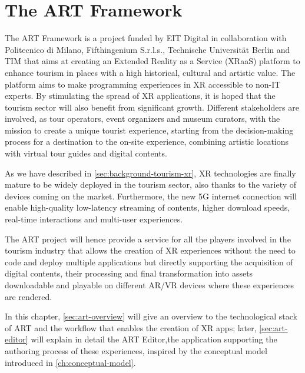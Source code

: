 \chapter{The ART Framework}
\label{ch:art}

The ART Framework is a project funded by EIT Digital in collaboration with Politecnico di Milano, Fifthingenium S.r.l.s., Technische Universität Berlin and TIM that aims at creating an Extended Reality as a Service (XRaaS) platform to enhance tourism in places with a high historical, cultural and artistic value. The platform aims to make programming experiences in XR accessible to non-IT experts. By stimulating the spread of XR applications, it is hoped that the tourism sector will also benefit from significant growth. Different stakeholders are involved, as tour operators, event organizers and museum curators, with the mission to create a unique tourist experience, starting from the decision-making process for a destination to the on-site experience, combining artistic locations with virtual tour guides and digital contents.

As we have described in \autoref{sec:background-tourism-xr}, \gls{XR} technologies are finally mature to be widely deployed in the tourism sector, also thanks to the variety of devices coming on the market. Furthermore, the new 5G internet connection will enable high-quality low-latency streaming of contents, higher download speeds, real-time interactions and multi-user experiences.

The ART project will hence provide a service for all the players involved in the tourism industry that allows the creation of \gls{XR} experiences without the need to code and deploy multiple applications but directly supporting the acquisition of digital contents, their processing and final transformation into assets downloadable and playable on different \gls{AR}/\gls{VR} devices where these experiences are rendered.

In this chapter, \autoref{sec:art-overview} will give an overview to the technological stack of ART and the workflow that enables the creation of XR apps; later, \autoref{sec:art-editor} will explain in detail the ART Editor,the application supporting the authoring process of these experiences,  inspired by the conceptual model introduced in \autoref{ch:conceptual-model}.


